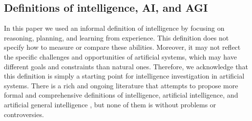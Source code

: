 \subsection{Definitions of intelligence, AI, and AGI} \label{sec:otherdefinitions}
In this paper we used an informal definition of intelligence by focusing on reasoning, planning, and learning from experience. This definition does not specify how to measure or compare these abilities. Moreover, it may not reflect the specific challenges and opportunities of artificial systems, which may have different goals and constraints than natural ones. Therefore, we acknowledge that this definition is simply a starting point for intelligence investigation in artificial systems. There is a rich and ongoing literature that attempts to propose more formal and comprehensive definitions of intelligence, artificial intelligence, and artificial general intelligence \cite{goertzel2014artificial, chollet2019measure}, but none of them is without problems or controversies.
